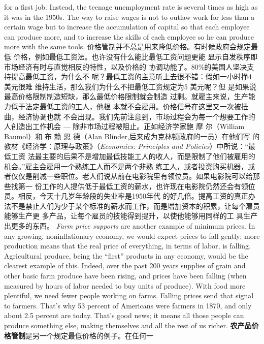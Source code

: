 \begin{paracol}{2}
for a first job. Instead, the teenage unemployment rate is several times as high as it was in the 1950s. The way to raise wages
is not to outlaw work for less than a certain wage but to increase
the accumulation of capital so that each employee can produce
more, and to increase the skills of each employee so he can produce more with the same tools.
\switchcolumn
价格管制并不总是用来降低价格。有时候政府会规定最低
价格，例如最低工资法。也许没有什么能比最低工资问题更能
显示自发秩序即市场经济有时与直觉相反的特性，以及价格的
协调功能了。80\%的美国人坚决支持提高最低工资，为什么不
呢？最低工资的主意听上去很不错：假如一小时挣4 美元很难
维持生活，那么我们为什么不把最低工资规定为5 美元呢？但
是如果说最高价格限制制造短缺，那么最低价格限制就会制造
过剩。就雇主来说，生产能力低于法定最低工资的工人，他根
本就不会雇用。价格信号在这里又一次被扭曲，经济协调也就
不会出现。我们先前注意到，市场过程会为每一个想要工作的
人创造出工作机会 --- 除非市场过程被阻止。正如经济学家鲍
摩 尔（William Baumol）和 布 赖 恩 德（Alan Blinder,后来成为克林顿政府的一员）在他们写 的教材《经济学：原理与政策》（\textit{Economics: Principles and Policies}）中所说：“最低工资
法最主要的后果不是增加最低技能工人的收人，而是限制了他们被雇用的机会。”雇主会雇用一个熟练工人而不是两个非熟
练工人，或者投资购买机器，或者仅仅是削减一些职位。老人们说从前在电影院里有领位员。如果电影院可以给那些找第一
份工作的人提供低于最低工资的薪水，也许现在电影院仍然还会有领位员。相反，今天十几岁年龄段的失业率是1950年代
的好几倍。提高工资的真正办法不是禁止人们为少于某个标准的薪水而工作，而是增加资本的积累，让每个雇员能够生产更
多产品，让每个雇员的技能得到提升，以使他能够用同样的工
具生产出更多的东西。
\switchcolumn*
\textit{Farm price supports} are another example of minimum prices. In
any growing, noninflationary economy, we would expect prices
to fall gently; more production means that the real price of
everything, in terms of labor, is falling. Agricultural produce,
being the ``first'' products in any economy, would be the clearest
example of this. Indeed, over the past 200 years supplies of
grain and other basic farm produce have been rising, and prices
have been falling (when measured by hours of labor needed to
buy units of produce). With food more plentiful, we need fewer people working on farms. Falling prices send that signal to
farmers. That's why 53 percent of Americans were farmers in
1870, and only about 2.5 percent are today. That's good news;
it means all those people can produce something else, making
themselves and all the rest of us richer.
\switchcolumn
\textbf{农产品价格管制}是另一个规定最低价格的例子。在任何一

\end{paracol}
